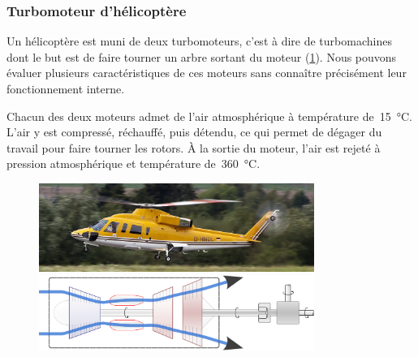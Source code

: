 \subsubsection{Turbomoteur d’hélicoptère}
\label{exo_turbomoteur_puissances_spe}

	Un hélicoptère est muni de deux turbomoteurs, c’est à dire de turbomachines dont le but est de faire tourner un arbre sortant du moteur (\cref{fig_s76b}). Nous pouvons évaluer plusieurs caractéristiques de ces moteurs sans connaître précisément leur fonctionnement interne.\onlyframabook{\pagebreak}%
	
	Chacun des deux moteurs admet de l’air atmosphérique à température de~\SI{15}{\degreeCelsius}. L’air y est compressé, réchauffé, puis détendu, ce qui permet de dégager du travail pour faire tourner les rotors. À la sortie du moteur, l’air est rejeté à pression atmosphérique et température de~\SI{360}{\degreeCelsius}.

	\begin{figure}
		\begin{center}
			\includegraphics[width=0.8\textwidth]{images/sikorsky_s76b.jpg}
			\\\vspace{0.3cm}
			\includegraphics[width=0.8\textwidth]{images/turbomoteur_principe.png}
		\end{center}
		\label{fig_s76b}
	\end{figure}

